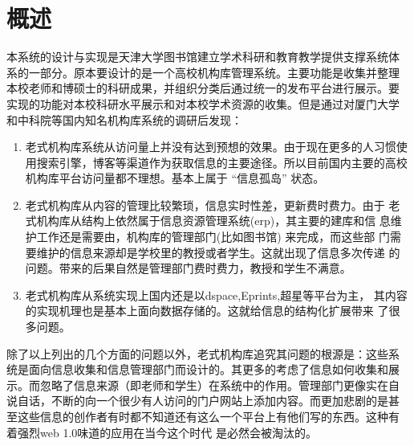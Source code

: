 
\chapter{概述}
\label{chap:intro}

本系统的设计与实现是天津大学图书馆建立学术科研和教育教学提供支撑系统体
系的一部分。原本要设计的是一个高校机构库管理系统。主要功能是收集并整理
本校老师和博硕士的科研成果，并组织分类后通过统一的发布平台进行展示。要
实现的功能对本校科研水平展示和对本校学术资源的收集。但是通过对厦门大学
和中科院等国内知名机构库系统的调研后发现：
\begin{enumerate}
\item 老式机构库系统从访问量上并没有达到预想的效果。由于现在更多的人习惯使
  用搜索引擎，博客等渠道作为获取信息的主要途径。所以目前国内主要的高校
  机构库平台访问量都不理想。基本上属于 “信息孤岛” 状态。
\item 老式机构库从内容的管理比较繁琐，信息实时性差，更新费时费力。由于
  老式机构库从结构上依然属于信息资源管理系统(erp)，其主要的建库和信
  息维护工作还是需要由，机构库的管理部门(比如图书馆) 来完成，而这些部
  门需要维护的信息来源却是学校里的教授或者学生。这就出现了信息多次传递
  的问题。带来的后果自然是管理部门费时费力，教授和学生不满意。
\item 老式机构库从系统实现上国内还是以dspace,Eprints,超星等平台为主，
  其内容的实现机理也是基本上面向数据存储的。这就给信息的结构化扩展带来
  了很多问题。
\end{enumerate}
除了以上列出的几个方面的问题以外，老式机构库追究其问题的根源是：这些系
统是面向信息收集和信息管理部门而设计的。其更多的考虑了信息如何收集和展
示。而忽略了信息来源（即老师和学生）在系统中的作用。管理部门更像实在自
说自话，不断的向一个很少有人访问的门户网站上添加内容。而更加悲剧的是甚
至这些信息的创作者有时都不知道还有这么一个平台上有他们写的东西。这种有
着强烈web 1.0味道的应用在当今这个时代
是必然会被淘汰的。\\